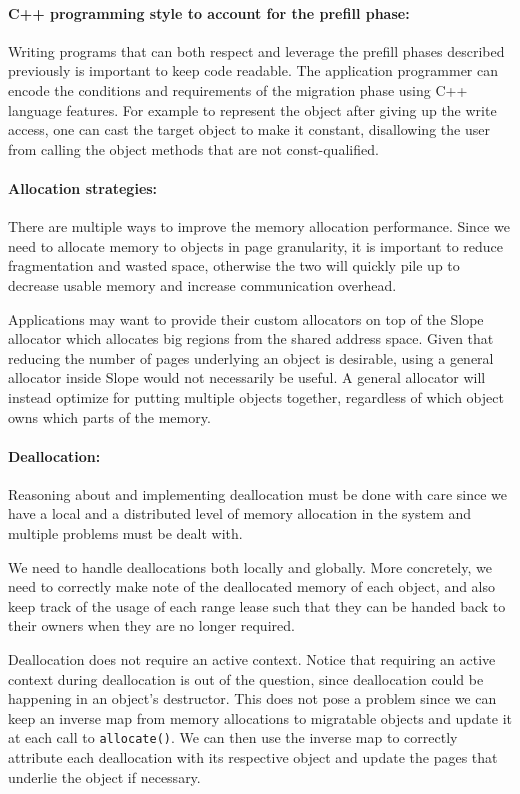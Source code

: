 \paragraph{C++ programming style to account for the prefill phase:}
\label{sec:conform}
Writing programs that can both respect and leverage the prefill phases
described previously is important to keep code readable. The application
programmer can encode the
conditions and requirements of the migration phase using C++ language features.
For example to represent the object after giving up the write access, one can
cast the target object to make it constant, disallowing the user from calling
the object methods that are not const-qualified.

\paragraph{Allocation strategies:} There are multiple ways to improve the memory
allocation performance. Since we need to allocate memory to objects in page
granularity, it is important to reduce fragmentation and wasted space,
otherwise the two will quickly pile up to decrease usable memory and increase
communication overhead.

Applications may want to provide their custom allocators on top of the Slope
allocator which allocates big regions from the shared address space. Given that
reducing the number of pages underlying an object is desirable, using a general
allocator inside Slope would not necessarily be useful. A general allocator
will instead optimize for putting multiple objects together, regardless of which
object owns which parts of the memory.

\paragraph{Deallocation:} Reasoning about and implementing deallocation must
be done with care since we have a local and a distributed level of memory
allocation in the system and multiple problems must be dealt with.

We need to handle deallocations both locally and globally. More concretely, we
need to correctly make note of the deallocated memory of each object, and also
keep track of the usage of each range lease such that they can be handed back
to their owners when they are no longer required.

Deallocation does not require an active context. Notice that requiring
an active context during deallocation is out of the question, since
deallocation could be happening in an object's destructor. This does not pose
a problem since we can keep an inverse map from memory allocations to
migratable objects and update it at each call to \texttt{allocate()}. We can
then use the inverse map to correctly attribute each deallocation with its
respective object and update the pages that underlie the object if necessary.

